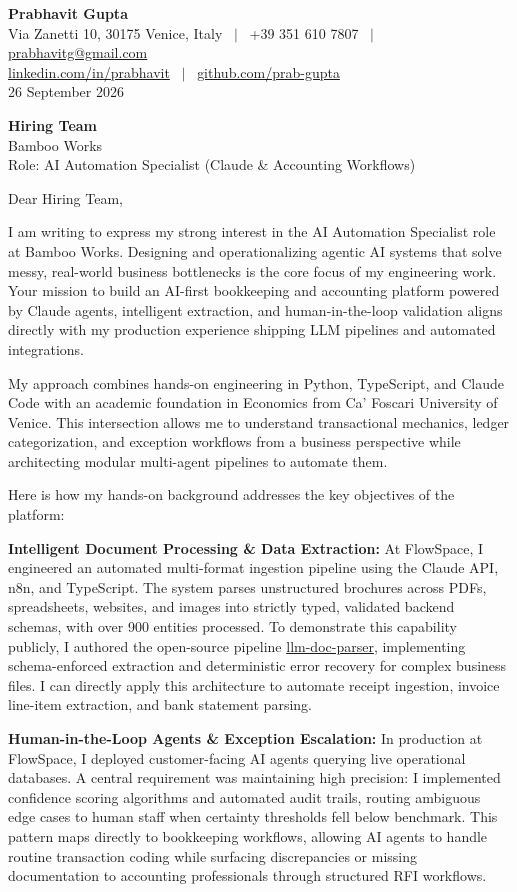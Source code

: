 \documentclass[11pt,a4paper]{article}
\begin{document}
\textbf{\large Prabhavit Gupta}\\
Via Zanetti 10, 30175 Venice, Italy ~$\vert$~ +39 351 610 7807 ~$\vert$~ \href{mailto:prabhavitg@gmail.com}{prabhavitg@gmail.com}\\
\href{https://www.linkedin.com/in/prabhavit/}{linkedin.com/in/prabhavit} ~$\vert$~ \href{https://github.com/prab-gupta}{github.com/prab-gupta}\\
26 September 2026

\textbf{Hiring Team}\\
Bamboo Works\\
Role: AI Automation Specialist (Claude \& Accounting Workflows)

Dear Hiring Team,

I am writing to express my strong interest in the AI Automation Specialist role at Bamboo Works. Designing and operationalizing agentic AI systems that solve messy, real-world business bottlenecks is the core focus of my engineering work. Your mission to build an AI-first bookkeeping and accounting platform powered by Claude agents, intelligent extraction, and human-in-the-loop validation aligns directly with my production experience shipping LLM pipelines and automated integrations.

My approach combines hands-on engineering in Python, TypeScript, and Claude Code with an academic foundation in Economics from Ca' Foscari University of Venice. This intersection allows me to understand transactional mechanics, ledger categorization, and exception workflows from a business perspective while architecting modular multi-agent pipelines to automate them.

Here is how my hands-on background addresses the key objectives of the platform:

\textbf{Intelligent Document Processing \& Data Extraction:} At FlowSpace, I engineered an automated multi-format ingestion pipeline using the Claude API, n8n, and TypeScript. The system parses unstructured brochures across PDFs, spreadsheets, websites, and images into strictly typed, validated backend schemas, with over 900 entities processed. To demonstrate this capability publicly, I authored the open-source pipeline \href{https://github.com/prab-gupta/llm-doc-parser}{llm-doc-parser}, implementing schema-enforced extraction and deterministic error recovery for complex business files. I can directly apply this architecture to automate receipt ingestion, invoice line-item extraction, and bank statement parsing.

\textbf{Human-in-the-Loop Agents \& Exception Escalation:} In production at FlowSpace, I deployed customer-facing AI agents querying live operational databases. A central requirement was maintaining high precision: I implemented confidence scoring algorithms and automated audit trails, routing ambiguous edge cases to human staff when certainty thresholds fell below benchmark. This pattern maps directly to bookkeeping workflows, allowing AI agents to handle routine transaction coding while surfacing discrepancies or missing documentation to accounting professionals through structured RFI workflows.
\end{document}
